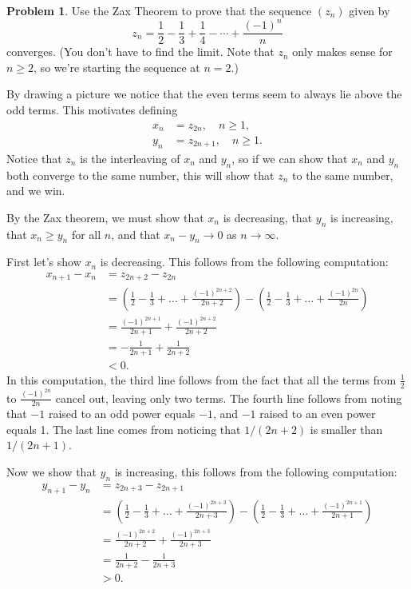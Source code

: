 \documentclass[11pt,oneside]{amsart}
\theoremstyle{definition}
\newtheorem{problem}{Problem}
\theoremstyle{plain}
\begin{document}
    \begin{problem}
        Use the Zax Theorem to prove that the sequence $(z_n)$ given by 
        \[z_n=\frac{1}{2}-\frac{1}{3}+\frac{1}{4}-\cdots+\frac{(-1)^n}{n}
        \] 
        converges. (You don't have to find the limit. Note that $z_n$ only makes sense for $n\geq 2$, so we're starting the sequence at $n=2$.) 
    \end{problem}
    \begin{solution}
        By drawing a picture we notice that the even terms seem to always lie above the odd terms. This motivates defining
        \begin{align*}
            x_n &= z_{2n},\quad n\geq 1,\\
            y_n &= z_{2n+1},\quad n\geq 1.
        \end{align*}
        Notice that $z_n$ is the interleaving of $x_n$ and $y_n$, so if we can show that $x_n$ and $y_n$ both converge to the same number, this will show that $z_n$ to the same number, and we win.

        By the Zax theorem, we must show that $x_n$ is decreasing, that $y_n$ is increasing, that $x_n\geq y_n$ for all $n$, and that $x_n-y_n\to 0$ as $n\to\infty$.

        First let's show $x_n$ is decreasing. This follows from the following computation:
        \[\begin{split}
            x_{n+1}-x_n &= z_{2n+2}-z_{2n}\\
            &= \left(\frac 12-\frac13+\dots+\frac{(-1)^{2n+2}}{2n+2}\right)-\left(\frac 12-\frac13+\dots+\frac{(-1)^{2n}}{2n}\right)\\
            &= \frac{(-1)^{2n+1}}{2n+1}+\frac{(-1)^{2n+2}}{2n+2}\\
            &= -\frac 1{2n+1}+\frac 1{2n+2}\\
            &<0.
        \end{split}\]
        In this computation, the third line follows from the fact that all the terms from $\frac 12$ to $\frac{(-1)^{2n}}{2n}$ cancel out, leaving only two terms. The fourth line follows from noting that $-1$ raised to an odd power equals $-1$, and $-1$ raised to an even power equals 1. The last line comes from noticing that $1/(2n+2)$ is smaller than $1/(2n+1)$.

        Now we show that $y_n$ is increasing, this follows from the following computation:
        \[\begin{split}
            y_{n+1}-y_n &= z_{2n+3}-z_{2n+1}\\
            &= \left(\frac 12-\frac13+\dots+\frac{(-1)^{2n+3}}{2n+3}\right)-\left(\frac 12-\frac13+\dots+\frac{(-1)^{2n+1}}{2n+1}\right)\\
            &= \frac{(-1)^{2n+2}}{2n+2}+\frac{(-1)^{2n+3}}{2n+3}\\
            &= \frac 1{2n+2}-\frac 1{2n+3}\\
            &>0.
        \end{split}\]
        

\end{solution}
\end{document}
